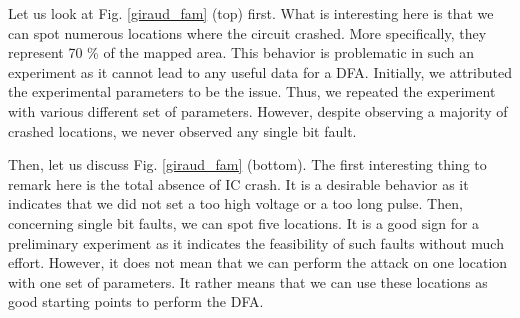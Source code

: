 			Let us look at Fig. \ref{giraud_fam} (top) first.
			What is interesting here is that we can spot numerous locations where the circuit crashed.
			More specifically, they represent 70 \% of the mapped area.
			This behavior is problematic in such an experiment as it cannot lead to any useful data for a DFA.
			Initially, we attributed the experimental parameters to be the issue.
			Thus, we repeated the experiment with various different set of parameters.
			However, despite observing a majority of crashed locations, we never observed any single bit fault.

			Then, let us discuss Fig. \ref{giraud_fam} (bottom).
			The first interesting thing to remark here is the total absence of IC crash.
			It is a desirable behavior as it indicates that we did not set a too high voltage or a too long pulse.
			Then, concerning single bit faults, we can spot five locations.
			It is a good sign for a preliminary experiment as it indicates the feasibility of such faults without much effort.
			However, it does not mean that we can perform the attack on one location with one set of parameters.
			It rather means that we can use these locations as good starting points to perform the DFA.


